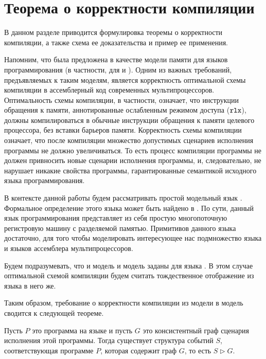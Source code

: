 \pagebreak

\section{Теорема о корректности компиляции}

В данном разделе приводится формулировка теоремы о
корректности компиляции, а также схема ее доказательства
и пример ее применения.

Напомним, что \Wkm была предложена в качестве модели памяти
для языков программирования (в частности, для \CPP и \LLVMIR).
Одним из важных требований, предъявляемых к таким моделям,
является корректность оптимальной схемы компиляции
в ассемблерный код современных мультипроцессоров.
Оптимальность схемы компиляции, в частности,
означает, что инструкции обращения к памяти,
аннотированные ослабленным режимом доступа ($\mathtt{rlx}$),
должны компилироваться в обычные инструкции обращения к
памяти целевого процессора, без вставки барьеров памяти.
Корректность схемы компиляции означает, что после
компиляции множество допустимых сценариев исполнения программы
не должно увеличиваться. То есть процесс компиляции программы
не должен привносить новые сценарии исполнения программы,
и, следовательно, не нарушает никакие свойства программы,
гарантированные семантикой исходного языка программирования.

В контексте данной работы будем рассматривать
простой модельный язык \LLANG.
Формальное определение этого языка может быть
найдено в \cite[Рис.2]{Podkopaev-al:POPL19}.
По сути, данный язык программирования представляет
из себя простую многопоточную регистровую машину
с разделяемой памятью.
Примитивов данного языка достаточно,
для того чтобы моделировать интересующее
нас подмножество языка \CPP и языков ассемблера мультипроцессоров.

Будем подразумевать, что и модель \Wkm
и модель \IMM заданы для языка \LLANG.
В этом случае оптимальной схемой компиляции будем считать
тождественное отображение из языка \LLANG в него же.

Таким образом, требование о корректности компиляции
из модели \Wkm в модель \IMM сводится к следующей теореме. 

\begin{theorem}
  \label{thm:main}
  Пусть $P$ это программа на языке \LLANG
  и пусть $G$ это \IMM консистентный граф сценария исполнения этой программы.
  Тогда существует структура событий $S$, соответствующая программе $P$,
  которая содержит граф $G$, то есть $S \rhd G$.
\end{theorem}

